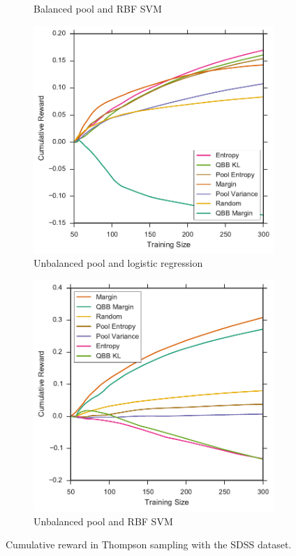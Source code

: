 \begin{figure}[p]
\begin{subfigure}{.5\textwidth}
		\caption{Balanced pool and RBF SVM}
		\label{fig:sdss_br_sum_rewards}
	\end{subfigure}
	\begin{subfigure}{.5\textwidth}
		\centering
		\includegraphics[width=\textwidth]{figures/5_thompson/sdss_ul_sum_rewards}
		\caption{Unbalanced pool and logistic regression}
		\label{fig:sdss_ul_sum_rewards}
	\end{subfigure}%
	\begin{subfigure}{.5\textwidth}
		\centering
		\includegraphics[width=\linewidth]{figures/5_thompson/sdss_ur_sum_rewards}
		\caption{Unbalanced pool and RBF SVM}
		\label{fig:sdss_ur_sum_rewards}
	\end{subfigure}
	\caption[Cumulative reward of heuristics (SDSS)]{
		Cumulative reward in Thompson sampling with the SDSS dataset.}
	\label{fig:sdss_sum_rewards}
\end{figure}


